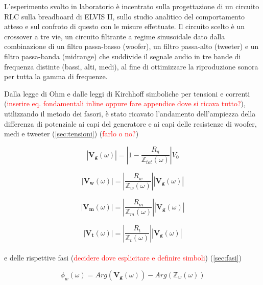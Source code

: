 \documentclass[12pt,italian]{article}
\newcommand{\err}[1]{\textcolor{red}{#1}}
\begin{document}
L'esperimento svolto in laboratorio è incentrato sulla progettazione di un
circuito RLC sulla breadboard di ELVIS II, sullo studio analitico del
comportamento atteso e sul confroto di questo con le misure effettuate. Il
circuito scelto è un crossover a tre vie, un circuito filtrante a regime
sinusoidale dato dalla combinazione di un filtro passa-basso (woofer), un
filtro passa-alto (tweeter) e un filtro passa-banda (midrange) che suddivide il
segnale audio in tre bande di frequenza distinte (bassi, alti, medi), al fine
di ottimizzare la riproduzione sonora per tutta la gamma di frequenze.

Dalla legge di Ohm e dalle leggi di Kirchhoff simboliche per tensioni e
correnti (\err{inserire eq. fondamentali inline oppure fare appendice dove si
	ricava tutto?}), utilizzando il metodo dei fasori, è stato ricavato l'andamento
dell'ampiezza della differenza di potenziale ai capi del generatore e ai capi
delle resistenze di woofer, medi e tweeter (\ref{sec:tensioni}) (\err{farlo o
	no?})

\begin{equation}
	\left| \mathbf{V_{g}}(\omega) \right| = \left| 1 - \frac{R_g}
	{\mathbb{Z}_{tot}(\omega)}\right| V_{0}
	\label{eq:Vg}
\end{equation}

\begin{equation}
	\left| \mathbf{V_{w}}(\omega) \right| = \left| \frac{R_{w}}
	{\mathbb{Z}_{w}(\omega)}\right|\left| \mathbf{V_{g}}(\omega) \right|
	\label{eq:Vw}
\end{equation}

\begin{equation}
	\left| \mathbf{V_{m}}(\omega) \right| = \left| \frac{R_{m}}
	{\mathbb{Z}_{m}(\omega)}\right|\left| \mathbf{V_{g}}(\omega) \right|
	\label{eq:Vm}
\end{equation}

\begin{equation}
	\left| \mathbf{V_{t}}(\omega) \right| = \left| \frac{R_{t}}
	{\mathbb{Z}_{t}(\omega)}\right|\left| \mathbf{V_{g}}(\omega) \right|
	\label{eq:Vt}
\end{equation}
\\
e delle rispettive fasi (\err{decidere dove esplicitare e definire simboli}) (\ref{sec:fasi})

\begin{equation}
	\phi_{w}(\omega) = Arg(\mathbf{V_{g}}(\omega)) - Arg(\mathbb{Z}_{w}(\omega))
\end{equation}
\end{document}
